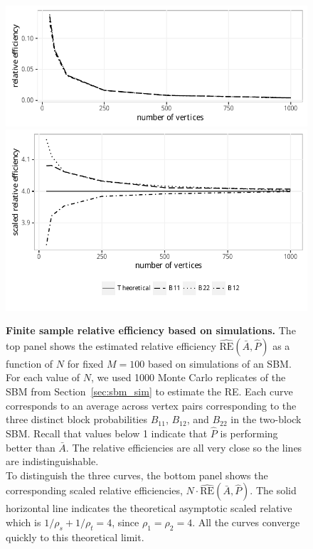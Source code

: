 \documentclass[10pt,letterpaper]{article}
\renewcommand{\hat}{\widehat}
\begin{document}
\begin{figure}[!htb]
    \centering
    \includegraphics[width=1\textwidth]{RE.pdf}
    \includegraphics[width=1\textwidth]{scaled_RE.pdf}
    \caption{{\bf Finite sample relative efficiency based on simulations. }
    The top panel shows the estimated relative efficiency $\hat{\mathrm{RE}}(\bar{A},\hat{P})$ as a function of $N$ for fixed $M=100$ based on simulations of an SBM. 
    For each value of $N$, we used 1000 Monte Carlo replicates of the SBM from Section~\ref{sec:sbm_sim} to estimate the RE.
    Each curve corresponds to an average across vertex pairs corresponding to the three distinct block probabilities $B_{11}$, $B_{12}$, and $B_{22}$ in the two-block SBM.
    Recall that values below 1 indicate that $\hat{P}$ is performing better than $\bar{A}$.
    The relative efficiencies are all very close so the lines are indistinguishable. \\
    To distinguish the three curves, the bottom panel shows the corresponding scaled relative efficiencies, $N\cdot \hat{\mathrm{RE}}(\bar{A},\hat{P})$.
    The solid horizontal line indicates the theoretical asymptotic scaled relative which is  $1/\rho_s+1/\rho_t=4$, since $\rho_1=\rho_2=4$.
    All the curves converge quickly to this theoretical limit. }
    \label{fig:RE}
\end{figure}
\end{document}
